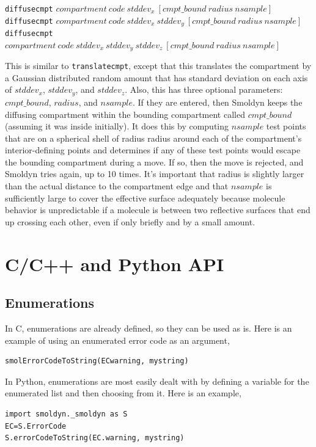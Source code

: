 \documentclass {book}
\newcommand {\ttt} {\texttt}
\begin{document}
\begin{description}
\item{\ttt{diffusecmpt} $compartment\ code\ stddev_x\ [cmpt\_bound\ radius\ nsample]$\\
\ttt{diffusecmpt} $compartment\ code\ stddev_x\ stddev_y\ [cmpt\_bound\ radius\ nsample]$\\
\ttt{diffusecmpt} $compartment\ code\ stddev_x\ stddev_y\ stddev_z\ [cmpt\_bound\ radius\ nsample]$}

This is similar to \ttt{translatecmpt}, except that this translates the compartment by a Gaussian distributed random amount that has standard deviation on each axis of $stddev_x$, $stddev_y$, and $stddev_z$. Also, this has three optional parameters: $cmpt\_bound$, $radius$, and $nsample$. If they are entered, then Smoldyn keeps the diffusing compartment within the bounding compartment called $cmpt\_bound$ (assuming it was inside initially). It does this by computing $nsample$ test points that are on a spherical shell of radius radius around each of the compartment's interior-defining points and determines if any of these test points would escape the bounding compartment during a move. If so, then the move is rejected, and Smoldyn tries again, up to 10 times. It's important that radius is slightly larger than the actual distance to the compartment edge and that $nsample$ is sufficiently large to cover the effective surface adequately because molecule behavior is unpredictable if a molecule is between two reflective surfaces that end up crossing each other, even if only briefly and by a small amount. 

\end{description}


\chapter{C/C++ and Python API}



\section{Enumerations}

In C, enumerations are already defined, so they can be used as is. Here is an example of using an enumerated error code as an argument, 
\begin{lstlisting}[style=SSAC]
smolErrorCodeToString(ECwarning, mystring)
\end{lstlisting}

In Python, enumerations are most easily dealt with by defining a variable for the enumerated list and then choosing from it. Here is an example, 
\begin{lstlisting}[style=SSAC]
import smoldyn._smoldyn as S
EC=S.ErrorCode
S.errorCodeToString(EC.warning, mystring)
\end{lstlisting}
\end{document}
